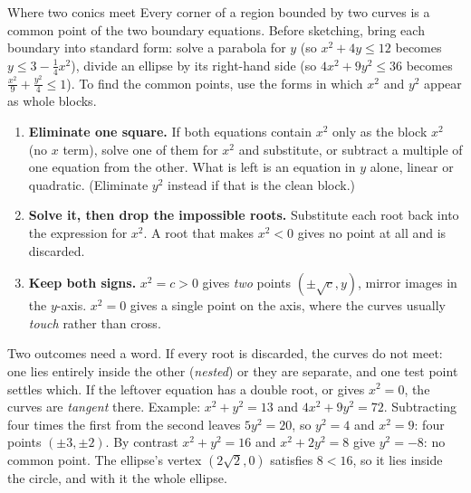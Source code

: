 \begin{rulebox}{Where two conics meet}
Every corner of a region bounded by two curves is a common point of the
two boundary equations. Before sketching, bring each boundary into
standard form: solve a parabola for $y$ (so $x^{2}+4y\le12$ becomes
$y\le3-\tfrac14x^{2}$), divide an ellipse by its right-hand side (so
$4x^{2}+9y^{2}\le36$ becomes $\tfrac{x^{2}}{9}+\tfrac{y^{2}}{4}\le1$). To
find the common points, use the forms in which $x^{2}$ and $y^{2}$ appear
as whole blocks.
\begin{enumerate}[leftmargin=1.8em,itemsep=0.3ex]
  \item \textbf{Eliminate one square.} If both equations contain $x^{2}$
        only as the block $x^{2}$ (no $x$ term), solve one of them for
        $x^{2}$ and substitute, or subtract a multiple of one equation from
        the other. What is left is an equation in $y$ alone, linear or
        quadratic. (Eliminate $y^{2}$ instead if that is the clean block.)
  \item \textbf{Solve it, then drop the impossible roots.} Substitute each
        root back into the expression for $x^{2}$. A root that makes
        $x^{2}<0$ gives no point at all and is discarded.
  \item \textbf{Keep both signs.} $x^{2}=c>0$ gives \emph{two} points
        $(\pm\sqrt{c},y)$, mirror images in the $y$-axis. $x^{2}=0$ gives a
        single point on the axis, where the curves usually \emph{touch}
        rather than cross.
\end{enumerate}
Two outcomes need a word. If every root is discarded, the curves do not
meet: one lies entirely inside the other (\emph{nested}) or they are
separate, and one test point settles which. If the leftover equation has a
double root, or gives $x^{2}=0$, the curves are \emph{tangent} there.
Example: $x^{2}+y^{2}=13$ and $4x^{2}+9y^{2}=72$. Subtracting four times the
first from the second leaves $5y^{2}=20$, so $y^{2}=4$ and $x^{2}=9$: four
points $(\pm3,\pm2)$. By contrast $x^{2}+y^{2}=16$ and $x^{2}+2y^{2}=8$ give
$y^{2}=-8$: no common point. The ellipse's vertex $(2\sqrt2,0)$ satisfies
$8<16$, so it lies inside the circle, and with it the whole ellipse.
\end{rulebox}

